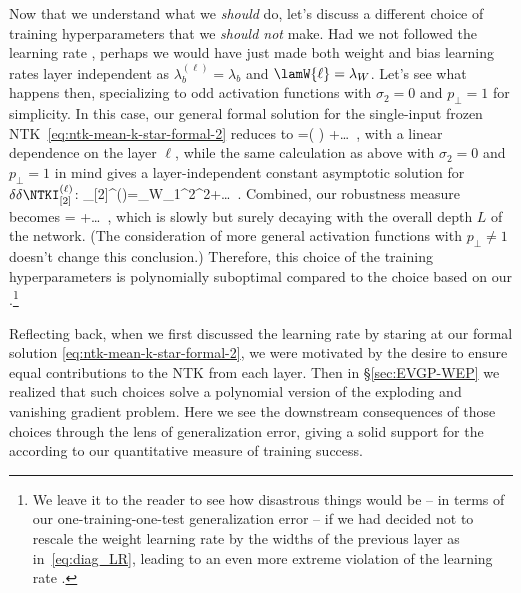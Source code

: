 Now that we understand what we \emph{should} do, let's discuss a different choice of training hyperparameters that we \emph{should not} make. Had we not followed the learning rate , perhaps we would have just made both weight and bias learning rates layer independent as $\lambda_b^{(\ell)} = \lambda_b$ and  $\lamW{\ell}=\lambda_W$. Let's see what happens then, specializing to odd activation functions with $\sigma_2=0$ and $p_{\perp}=1$ for simplicity. In this case, our general formal solution for the single-input frozen NTK~\eqref{eq:ntk-mean-k-star-formal-2} reduces to
\be\label{eq:frozen-ntk-k-star-solution-odd-mis-scaled}
\Ti{\NTKI}{\M\M}{\ell}=\le( \ri) \ell +\ldots\, ,
\ee
with a linear dependence on the layer $\ell$, while the same calculation as above with $\sigma_2=0$ and $p_{\perp}=1$ in mind gives a layer-independent constant asymptotic solution for $\delta\delta \NTKI_{[2]}^{(\ell)}$:
\be
\delta\delta \NTKI_{[2]}^{(\ell)}=\lambda_W\sigma_1^2\delta^2+\ldots\, .
\ee
Combined, our robustness measure becomes
\be\label{eq:robustness-k-star-sol-bad}
=  +\ldots\, ,
\ee
which is slowly but surely decaying with the overall depth $L$ of the network. (The consideration of more general activation functions with $p_{\perp} \neq 1$ doesn't change this conclusion.) Therefore, this choice of the training hyperparameters is polynomially suboptimal compared to the choice based on our .\footnote{We leave it to the reader to see how disastrous things would be -- in terms of our one-training-one-test generalization error -- if we had decided not to rescale the weight learning rate by the widths of the previous layer as in~\eqref{eq:diag_LR}, leading to an even more extreme violation of the learning rate .
}

Reflecting back, when we first discussed the learning rate  by staring at our formal solution \eqref{eq:ntk-mean-k-star-formal-2}, we were motivated by the desire to ensure equal contributions to the NTK from each layer. Then in \S\ref{sec:EVGP-WEP} we realized that such choices solve a polynomial version of the exploding and vanishing gradient problem. Here we see the downstream consequences of those choices through the lens of generalization error, giving a solid support for the  according to our quantitative measure of training success.










